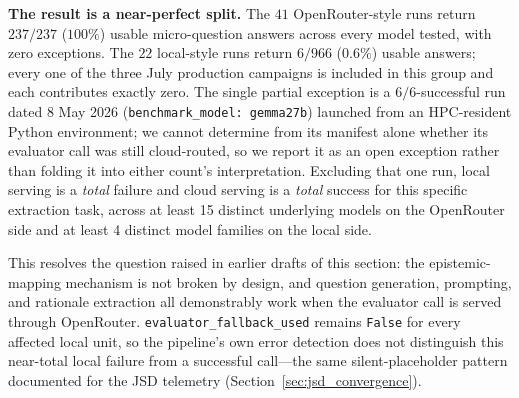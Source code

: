 \documentclass[11pt,journal,onecolumn]{IEEEtran}
\begin{document}
\textbf{The result is a near-perfect split.} The $41$ OpenRouter-style runs return $237/237$ ($100\%$) usable micro-question answers across every model tested, with zero exceptions. The $22$ local-style runs return $6/966$ ($0.6\%$) usable answers; every one of the three July production campaigns is included in this group and each contributes exactly zero. The single partial exception is a $6/6$-successful run dated 8 May 2026 (\texttt{benchmark\_model: gemma27b}) launched from an HPC-resident Python environment; we cannot determine from its manifest alone whether its evaluator call was still cloud-routed, so we report it as an open exception rather than folding it into either count's interpretation. Excluding that one run, local serving is a \emph{total} failure and cloud serving is a \emph{total} success for this specific extraction task, across at least 15 distinct underlying models on the OpenRouter side and at least 4 distinct model families on the local side.

This resolves the question raised in earlier drafts of this section: the epistemic-mapping mechanism is not broken by design, and question generation, prompting, and rationale extraction all demonstrably work when the evaluator call is served through OpenRouter. \texttt{evaluator\_fallback\_used} remains \texttt{False} for every affected local unit, so the pipeline's own error detection does not distinguish this near-total local failure from a successful call---the same silent-placeholder pattern documented for the JSD telemetry (Section~\ref{sec:jsd_convergence}).
\end{document}
